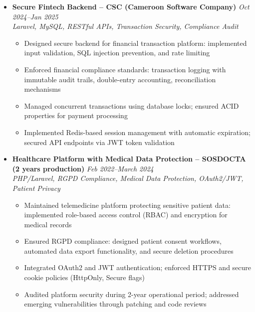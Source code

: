 \documentclass[a4paper,11pt]{article}
\begin{document}
\begin{itemize}[leftmargin=*, label={-}]
\item \textbf{Secure Fintech Backend -- CSC (Cameroon Software Company)} \hfill \textit{Oct 2024--Jan 2025} \\
\textit{Laravel, MySQL, RESTful APIs, Transaction Security, Compliance Audit} \vspace{-2pt}
    \begin{itemize}[leftmargin=0.4cm, nosep, label=\tiny$\bullet$]
        \item Designed secure backend for financial transaction platform: implemented input validation, SQL injection prevention, and rate limiting
        \item Enforced financial compliance standards: transaction logging with immutable audit trails, double-entry accounting, reconciliation mechanisms
        \item Managed concurrent transactions using database locks; ensured ACID properties for payment processing
        \item Implemented Redis-based session management with automatic expiration; secured API endpoints via JWT token validation
    \end{itemize}

\item \textbf{Healthcare Platform with Medical Data Protection -- SOSDOCTA (2 years production)} \hfill \textit{Feb 2022--March 2024} \\
\textit{PHP/Laravel, RGPD Compliance, Medical Data Protection, OAuth2/JWT, Patient Privacy} \vspace{-2pt}
    \begin{itemize}[leftmargin=0.4cm, nosep, label=\tiny$\bullet$]
        \item Maintained telemedicine platform protecting sensitive patient data: implemented role-based access control (RBAC) and encryption for medical records
        \item Ensured RGPD compliance: designed patient consent workflows, automated data export functionality, and secure deletion procedures
        \item Integrated OAuth2 and JWT authentication; enforced HTTPS and secure cookie policies (HttpOnly, Secure flags)
        \item Audited platform security during 2-year operational period; addressed emerging vulnerabilities through patching and code reviews
    \end{itemize}


\end{itemize}
\end{document}
